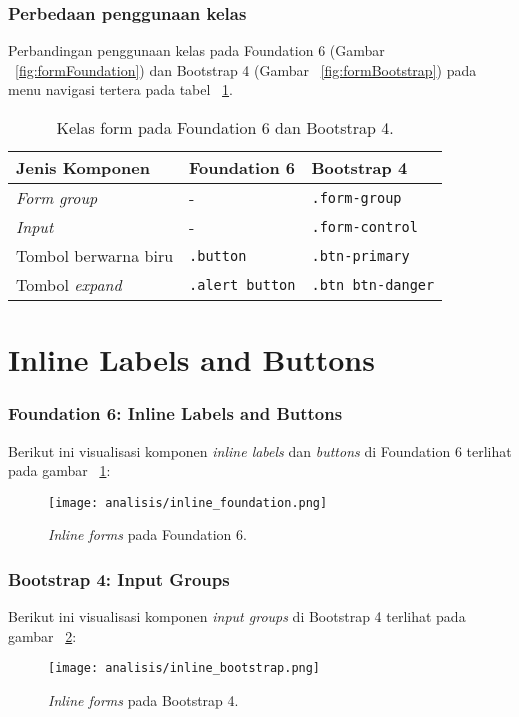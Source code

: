 \subsubsection{Perbedaan penggunaan kelas}
\noindent Perbandingan penggunaan kelas pada Foundation 6 (Gambar ~\ref{fig:formFoundation}) dan Bootstrap 4 (Gambar ~\ref{fig:formBootstrap}) pada menu navigasi tertera pada tabel ~\ref{table:form}.\\

\begin{table}[H] 
	\caption{Kelas form pada Foundation 6 dan Bootstrap 4.}
	\begin{tabular}{| p{} | p{} | p{} |} 
		\hline
		\textbf{Jenis Komponen} & \textbf{Foundation 6} & \textbf{Bootstrap 4}  \\ [0.5ex] 
		\hline	
		\textit{Form group} & - & \texttt{.form-group}\\
		\hline
		\textit{Input} & - & \texttt{.form-control}\\
		\hline			
		Tombol berwarna biru & \texttt{.button} & \texttt{.btn-primary}  \\
		\hline
		Tombol \textit{expand} & \texttt{.alert button} & \texttt{.btn btn-danger} \\[1ex]
		\hline
	\end{tabular}
	\label{table:form}
\end{table}

\section{Inline Labels and Buttons}
\subsubsection{Foundation 6: Inline Labels and Buttons}
Berikut ini visualisasi komponen \textit{inline labels} dan \textit{buttons} di Foundation 6 terlihat pada gambar ~\ref{fig:inlineFoundation}:
\begin{figure} [H]
	\centering  
	\texttt{[image: analisis/inline\_foundation.png]}  
	\caption{\textit{Inline forms} pada Foundation 6.}
	\label{fig:inlineFoundation}	 
\end{figure}

\subsubsection{Bootstrap 4: Input Groups}
Berikut ini visualisasi komponen \textit{input groups} di Bootstrap 4 terlihat pada gambar ~\ref{fig:inlineBootstrap}:
\begin{figure} [H]
	\centering  
	\texttt{[image: analisis/inline\_bootstrap.png]}  
	\caption{\textit{Inline forms} pada Bootstrap 4.}
	\label{fig:inlineBootstrap}	 
\end{figure}

